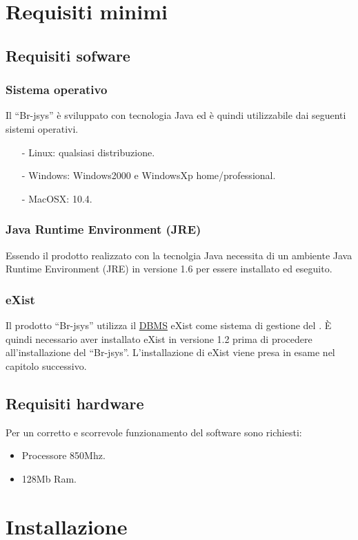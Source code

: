 \chapter{Requisiti minimi}
\section{Requisiti sofware }
\subsection{Sistema operativo}
Il ``Br-jsys'' \`e sviluppato con tecnologia Java ed \`e quindi utilizzabile dai seguenti sistemi operativi.
\begin{itemize}
\item[-] Linux: qualsiasi distribuzione.
\item[-] Windows: Windows2000 e WindowsXp home/professional.
\item[-] MacOSX: 10.4.
\end{itemize}
\subsection{Java Runtime Environment (JRE)}
Essendo il prodotto realizzato con la tecnolgia Java necessita di un ambiente Java Runtime Environment (JRE) in versione 1.6 per essere installato ed eseguito.
\subsection{eXist}
Il prodotto ``Br-jsys'' utilizza il \underline{DBMS} eXist come sistema di gestione del \rp. \`E quindi necessario aver installato eXist in versione 1.2 prima di procedere all'installazione del ``Br-jsys''. L'installazione di eXist viene presa in esame nel capitolo successivo.
\section{Requisiti hardware}
Per un corretto e scorrevole funzionamento del software sono richiesti:
\begin{itemize}
\item Processore 850Mhz.
\item 128Mb Ram.
\end{itemize}

\chapter{Installazione}
